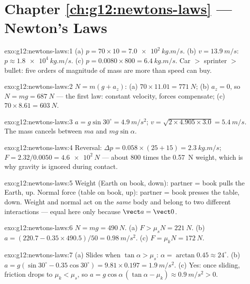 \section*{Chapter \ref{ch:g12:newtons-laws} --- Newton's Laws}

\begin{solution}{exo:g12:newtons-laws:1}
(a) $p = 70 \times 10 = \qty{7.0e2}{kg.m/s}$.
(b) $v = \qty{13.9}{m/s}$: $p \approx \qty{1.8e4}{kg.m/s}$.
(c) $p = 0.0080 \times 800 = \qty{6.4}{kg.m/s}$. Car $>$ sprinter $>$
bullet: five orders of magnitude of mass are more than speed can buy.
\end{solution}

\begin{solution}{exo:g12:newtons-laws:2}
$N = m(g + a_z)$: (a) $70 \times 11.01 = \qty{771}{N}$;
(b) $a_z = 0$, so $N = mg = \qty{687}{N}$ --- the first law: constant
velocity, forces compensate; (c) $70 \times 8.61 = \qty{603}{N}$.
\end{solution}

\begin{solution}{exo:g12:newtons-laws:3}
$a = g\sin 30^\circ = \qty{4.9}{m/s^2}$;
$v = \sqrt{2 \times 4.905 \times 3.0} = \qty{5.4}{m/s}$. The mass
cancels between $ma$ and $mg\sin\alpha$.
\end{solution}

\begin{solution}{exo:g12:newtons-laws:4}
Reversal: $\Delta p = 0.058 \times (25 + 15) = \qty{2.3}{kg.m/s}$;
$F = 2.32/0.0050 = \qty{4.6e2}{N}$ --- about $800$ times the
\qty{0.57}{N} weight, which is why gravity is ignored during contact.
\end{solution}

\begin{solution}{exo:g12:newtons-laws:5}
Weight (Earth on book, down): partner = book pulls the Earth, up.
Normal force (table on book, up): partner = book presses the table,
down. Weight and normal act on the \emph{same} body and belong to two
different interactions --- equal here only because $\vect a = \vect 0$.
\end{solution}

\begin{solution}{exo:g12:newtons-laws:6}
$N = mg = \qty{490}{N}$. (a) $F > \mu_s N = \qty{221}{N}$.
(b) $a = (220.7 - 0.35 \times 490.5)/50 = \qty{0.98}{m/s^2}$.
(c) $F = \mu_k N = \qty{172}{N}$.
\end{solution}

\begin{solution}{exo:g12:newtons-laws:7}
(a) Slides when $\tan\alpha > \mu_s$: $\alpha = \arctan 0.45 \approx
24^\circ$. (b) $a = g(\sin 30^\circ - 0.35\cos 30^\circ) =
9.81 \times 0.197 = \qty{1.9}{m/s^2}$. (c) Yes: once sliding,
friction drops to $\mu_k < \mu_s$, so
$a = g\cos\alpha\,(\tan\alpha - \mu_k) \approx \qty{0.9}{m/s^2} > 0$.
\end{solution}

